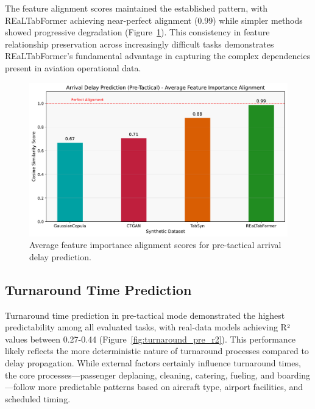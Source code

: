 \documentclass[conference]{IEEEtran}
\begin{document}
The feature alignment scores maintained the established pattern, with REaLTabFormer achieving near-perfect alignment (0.99) while simpler methods showed progressive degradation (Figure~\ref{fig:arrival_alignment}). This consistency in feature relationship preservation across increasingly difficult tasks demonstrates REaLTabFormer's fundamental advantage in capturing the complex dependencies present in aviation operational data.

\begin{figure}[htbp]
    \centering
    \includegraphics[width=0.8\linewidth]{plots/arrival_delay_min_pre-tactical/arrival_delay_min_pre-tactical_avg_alignment_score.pdf}
    \caption{Average feature importance alignment scores for pre-tactical arrival delay prediction.}
    \label{fig:arrival_alignment}
\end{figure}

\subsection{Turnaround Time Prediction}

Turnaround time prediction in pre-tactical mode demonstrated the highest predictability among all evaluated tasks, with real-data models achieving R² values between 0.27-0.44 (Figure~\ref{fig:turnaround_pre_r2}). This performance likely reflects the more deterministic nature of turnaround processes compared to delay propagation. While external factors certainly influence turnaround times, the core processes—passenger deplaning, cleaning, catering, fueling, and boarding—follow more predictable patterns based on aircraft type, airport facilities, and scheduled timing.
\end{document}
